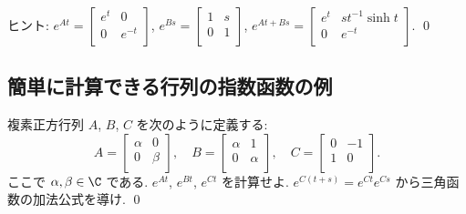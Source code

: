 \documentclass[12pt,twoside]{jarticle}
\begin{document}
\noindent
ヒント:   \(
  e^{At} =
  \begin{bmatrix}
    e^t & 0 \\
    0 & e^{-t} \\
  \end{bmatrix}
\), \(
  e^{Bs} =
  \begin{bmatrix}
    1 & s \\
    0 & 1 \\
  \end{bmatrix}
\), \(
  e^{At+Bs} =
  \begin{bmatrix}
    e^t & s t^{-1} \sinh t \\
    0 & e^{-t} \\
  \end{bmatrix}
\).
\qed


\subsection{簡単に計算できる行列の指数函数の例}
\label{sec:sec-exp-easy}


\begin{question}
  複素正方行列 $A$, $B$, $C$ を次のように定義する:
  \begin{equation*}
    A =
    \begin{bmatrix}
      \alpha & 0 \\
      0 & \beta \\
    \end{bmatrix},
    \quad
    B =
    \begin{bmatrix}
      \alpha & 1 \\
      0 & \alpha \\
    \end{bmatrix},
    \quad
    C =
    \begin{bmatrix}
      0 & -1 \\
      1 &  0 \\
    \end{bmatrix}.
  \end{equation*}
  ここで $\alpha,\beta\in\C$ である. 
  $e^{At}$, $e^{Bt}$, $e^{Ct}$ を計算せよ. 
  $e^{C(t+s)} = e^{Ct}e^{Cs}$ から三角函数の加法公式を導け.
  \qed
\end{question}

\end{document}
